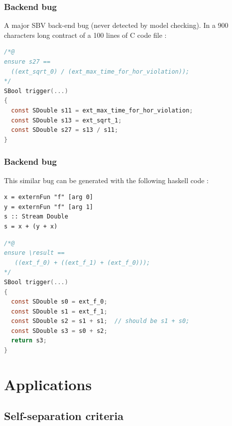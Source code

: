 \documentclass{beamer}
\begin{document}
\begin{frame}[fragile]
	\frametitle{Backend bug}
	
	A major SBV back-end bug (never detected by model checking). In a 900 characters long contract of a 100 lines of C code file :
	
\begin{lstlisting}[language=C]
/*@
ensure s27 == 
  ((ext_sqrt_0) / (ext_max_time_for_hor_violation));
*/
SBool trigger(...)
{
  const SDouble s11 = ext_max_time_for_hor_violation;
  const SDouble s13 = ext_sqrt_1;
  const SDouble s27 = s13 / s11;
}  
\end{lstlisting}
	
\end{frame}

\begin{frame}[fragile]
	\frametitle{Backend bug}
	
	This similar bug can be generated with the following haskell code :
\begin{verbatim}
x = externFun "f" [arg 0]
y = externFun "f" [arg 1]
s :: Stream Double
s = x + (y + x)
\end{verbatim}

\begin{lstlisting}[language=C, keywordstyle=\color{blue}]
/*@
ensure \result == 
   ((ext_f_0) + ((ext_f_1) + (ext_f_0)));
*/
SBool trigger(...)
{
  const SDouble s0 = ext_f_0;
  const SDouble s1 = ext_f_1;
  const SDouble s2 = s1 + s1;  // should be s1 + s0;
  const SDouble s3 = s0 + s2;
  return s3;
}  
\end{lstlisting}
\end{frame}

\section{Applications}
\subsection{Self-separation criteria}
\begin{frame}
	\tableofcontents[currentsubsection,sectionstyle=show/shaded,subsectionstyle=show/shaded/hide]
\end{frame}
\end{document}

